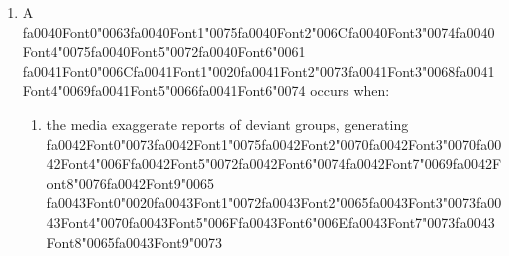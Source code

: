 \documentclass[12pt]{article}
\begin{document}
\begin{enumerate}[label=\arabic*.]
\begin{enumerate}[label=(\alph*)]
    \item audiences passively {\csname fa0037Font0\endcsname\char"0072}{\csname fa0037Font1\endcsname\char"0065}{\csname fa0037Font2\endcsname\char"006A}{\csname fa0037Font3\endcsname\char"0065}{\csname fa0037Font4\endcsname\char"0063}{\csname fa0037Font5\endcsname\char"0074} whatever messages they are given
    \item social interaction reinforces the ideas and images that {\csname fa0038Font0\endcsname\char"0061}{\csname fa0038Font1\endcsname\char"0072}{\csname fa0038Font2\endcsname\char"0065}{\csname fa0038Font3\endcsname\char"0020}{\csname fa0038Font4\endcsname\char"0069} {\csname fa0039Font0\endcsname\char"006D}{\csname fa0039Font1\endcsname\char"0070}{\csname fa0039Font2\endcsname\char"006F}{\csname fa0039Font3\endcsname\char"0073}{\csname fa0039Font4\endcsname\char"0065}{\csname fa0039Font5\endcsname\char"0064}
\end{enumerate}
\item A {\csname fa0040Font0\endcsname\char"0063}{\csname fa0040Font1\endcsname\char"0075}{\csname fa0040Font2\endcsname\char"006C}{\csname fa0040Font3\endcsname\char"0074}{\csname fa0040Font4\endcsname\char"0075}{\csname fa0040Font5\endcsname\char"0072}{\csname fa0040Font6\endcsname\char"0061} {\csname fa0041Font0\endcsname\char"006C}{\csname fa0041Font1\endcsname\char"0020}{\csname fa0041Font2\endcsname\char"0073}{\csname fa0041Font3\endcsname\char"0068}{\csname fa0041Font4\endcsname\char"0069}{\csname fa0041Font5\endcsname\char"0066}{\csname fa0041Font6\endcsname\char"0074} occurs when:
\begin{enumerate}[label=(\alph*)]
    \item the media exaggerate reports of deviant groups, generating {\csname fa0042Font0\endcsname\char"0073}{\csname fa0042Font1\endcsname\char"0075}{\csname fa0042Font2\endcsname\char"0070}{\csname fa0042Font3\endcsname\char"0070}{\csname fa0042Font4\endcsname\char"006F}{\csname fa0042Font5\endcsname\char"0072}{\csname fa0042Font6\endcsname\char"0074}{\csname fa0042Font7\endcsname\char"0069}{\csname fa0042Font8\endcsname\char"0076}{\csname fa0042Font9\endcsname\char"0065} {\csname fa0043Font0\endcsname\char"0020}{\csname fa0043Font1\endcsname\char"0072}{\csname fa0043Font2\endcsname\char"0065}{\csname fa0043Font3\endcsname\char"0073}{\csname fa0043Font4\endcsname\char"0070}{\csname fa0043Font5\endcsname\char"006F}{\csname fa0043Font6\endcsname\char"006E}{\csname fa0043Font7\endcsname\char"0073}{\csname fa0043Font8\endcsname\char"0065}{\csname fa0043Font9\endcsname\char"0073}

\end{enumerate}
\end{enumerate}
\end{document}

